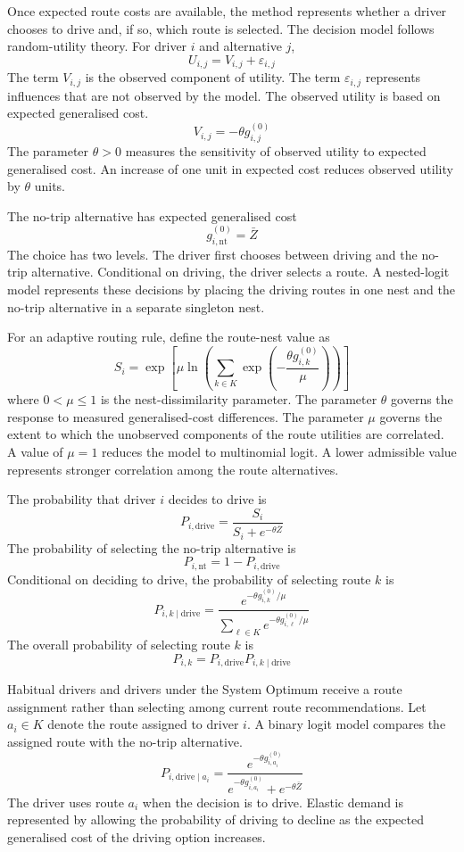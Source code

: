 \documentclass{article}
\begin{document}
Once expected route costs are available, the method represents whether a driver chooses to drive and, if so, which route is selected. The decision model follows random-utility theory. For driver $i$ and alternative $j$,
\[
U_{i,j}
=
V_{i,j}
+
\varepsilon_{i,j}
\]
The term $V_{i,j}$ is the observed component of utility. The term $\varepsilon_{i,j}$ represents influences that are not observed by the model. The observed utility is based on expected generalised cost.
\[
V_{i,j}
=
-\theta g_{i,j}^{(0)}
\]
The parameter $\theta>0$ measures the sensitivity of observed utility to expected generalised cost. An increase of one unit in expected cost reduces observed utility by $\theta$ units.

The no-trip alternative has expected generalised cost
\[
g_{i,\mathrm{nt}}^{(0)}
=
\bar Z
\]
The choice has two levels. The driver first chooses between driving and the no-trip alternative. Conditional on driving, the driver selects a route. A nested-logit model represents these decisions by placing the driving routes in one nest and the no-trip alternative in a separate singleton nest.

For an adaptive routing rule, define the route-nest value as
\[
S_i
=
\exp
\left[
\mu
\ln
\left(
\sum_{k\in K}
\exp
\left(
-\frac{\theta g_{i,k}^{(0)}}{\mu}
\right)
\right)
\right]
\]
where $0<\mu\leq1$ is the nest-dissimilarity parameter. The parameter $\theta$ governs the response to measured generalised-cost differences. The parameter $\mu$ governs the extent to which the unobserved components of the route utilities are correlated. A value of $\mu=1$ reduces the model to multinomial logit. A lower admissible value represents stronger correlation among the route alternatives.

The probability that driver $i$ decides to drive is
\[
P_{i,\mathrm{drive}}
=
\frac{
S_i
}{
S_i
+
e^{-\theta\bar Z}
}
\]
The probability of selecting the no-trip alternative is
\[
P_{i,\mathrm{nt}}
=
1-P_{i,\mathrm{drive}}
\]
Conditional on deciding to drive, the probability of selecting route $k$ is
\[
P_{i,k\mid\mathrm{drive}}
=
\frac{
e^{-\theta g_{i,k}^{(0)}/\mu}
}{
\displaystyle
\sum_{\ell\in K}
e^{-\theta g_{i,\ell}^{(0)}/\mu}
}
\]
The overall probability of selecting route $k$ is
\[
P_{i,k}
=
P_{i,\mathrm{drive}}
P_{i,k\mid\mathrm{drive}}
\]

Habitual drivers and drivers under the System Optimum receive a route assignment rather than selecting among current route recommendations. Let $a_i\in K$ denote the route assigned to driver $i$. A binary logit model compares the assigned route with the no-trip alternative.
\[
P_{i,\mathrm{drive}\mid a_i}
=
\frac{
e^{-\theta g_{i,a_i}^{(0)}}
}{
e^{-\theta g_{i,a_i}^{(0)}}
+
e^{-\theta\bar Z}
}
\]
The driver uses route $a_i$ when the decision is to drive. Elastic demand is represented by allowing the probability of driving to decline as the expected generalised cost of the driving option increases.
\end{document}
